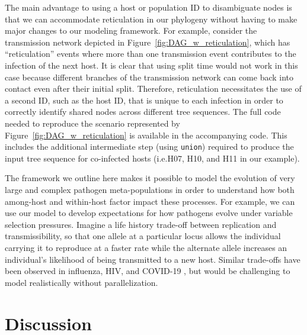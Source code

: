\documentclass[12pt]{article}
\newcommand{\tskit}[0]{\texttt{tskit}\xspace}
\newcommand{\slim}[0]{\texttt{SLiM}\xspace}
\newcommand{\pyslim}[0]{\texttt{pyslim}\xspace}
\newcommand*{\ie}{i.e.\xcomma}
\begin{document}
The main advantage to using a host or population ID to disambiguate nodes is that we can accommodate reticulation in our phylogeny without having to make major
changes to our modeling framework.
For example, consider the transmission network depicted in Figure~\ref{fig:DAG_w_reticulation},
which has ``reticulation'' events where more than one transmission event contributes to the infection of the next host.
It is clear that using split time would not work in this case because
different branches of the transmission network can come back into contact even after their initial split.
Therefore, reticulation necessitates the use of a second ID, such as the host ID,
that is unique to each infection in order to correctly identify shared nodes across different tree sequences.
The full code needed to reproduce the scenario represented by Figure~\ref{fig:DAG_w_reticulation} is available in the accompanying code.
This includes the additional intermediate step (using \verb|union|)
required to produce the input tree sequence for co-infected hosts (\ie H07, H10, and H11 in our example). %

The framework we outline here makes it possible to model the evolution of very large and complex pathogen meta-populations in order to understand how both among-host
and within-host factor impact these processes. For example, we can use our model to develop expectations for how pathogens evolve under variable selection pressures.
Imagine a life history trade-off between replication and transmissibility, so that one allele at a particular locus allows the
individual carrying it to reproduce at a faster rate while the alternate allele increases an individual's likelihood of being transmitted to a new host.
Similar trade-offs have been observed in influenza, HIV, and COVID-19 \citep{liang2023pathogenicity, arien2005replicative, zhu2022ancestral},
but would be challenging to model realistically without parallelization. 

\section*{Discussion}
\end{document}

